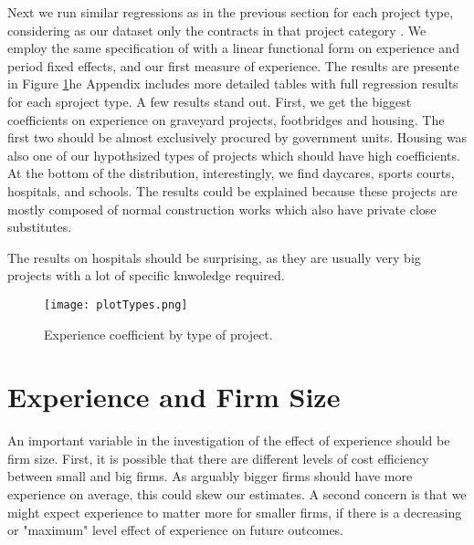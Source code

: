 %

Next we run similar regressions as in the previous section for each project type, considering as our dataset only the contracts in that project category . We employ the same specification of with a linear functional form on experience and period fixed effects, and our first measure of experience. The results are presente in Figure \ref{fig:typeestimates}he Appendix includes more detailed tables with full regression results for each sproject type. A few results stand out. First, we get the biggest coefficients on experience on graveyard projects, footbridges and housing. The first two should be almost exclusively procured by government units. Housing was also one of our hypothsized types of projects which should have high coefficients. At the bottom of the distribution, interestingly, we find daycares, sports courts, hospitals, and schools. The results could be explained because these projects are mostly composed of normal construction works which also have private close substitutes.

The results on hospitals should be surprising, as they are usually very big projects with a lot of specific knwoledge required.

%

\begin{figure}
  \texttt{[image: plotTypes.png]}
  \caption{Experience coefficient by type of project.}
  \label{fig:typeestimates}
\end{figure}

\section{Experience and Firm Size}
An important variable in the investigation of the effect of experience should be firm size. First, it is possible that there are different levels of cost efficiency between small and big firms. As arguably bigger firms should have more experience on average, this could skew our estimates. A second concern is that we might expect experience to matter more for smaller firms, if there is a decreasing or "maximum" level effect of experience on future outcomes.


